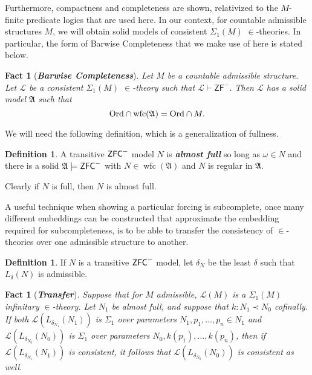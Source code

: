 \documentclass{amsart}
\newtheorem{fact}[theorem]{Fact}
\theoremstyle{definition}
\newtheorem{definition}[theorem]{Definition}
\theoremstyle{remark}
\newcommand{\ZFC}{\textup{\ensuremath{\textsf{ZFC}}}}
\newcommand{\Ord}{\textup{\ensuremath{\text{Ord}}}}
\DeclareMathOperator{\wfc}{wfc}
\begin{document}
Furthermore, compactness and completeness are shown, relativized to the $M$-finite predicate logics that are used here. In our context, for countable admissible structures $M$, we will obtain solid models of consistent $\Sigma_1(M)$ $\in$-theories. In particular, the form of Barwise Completeness that we make use of here is stated below.

\begin{fact}[\textbf{\emph{Barwise Completeness}}] \label{fact:completeness} Let $M$ be a countable admissible structure. Let $\mathcal L$ be a consistent $\Sigma_1(M)$ $\in$-theory such that $\mathcal L \vdash \textsf{ZF}^-$. Then $\mathcal L$ has a solid model $\mathfrak A$ such that $$\Ord \cap \wfc(\mathfrak A) = \Ord \cap M.$$ \end{fact}


We will need the following definition, which is a generalization of fullness.
\begin{definition} A transitive $\ZFC^-$ model $N$ is \emph{\textbf{almost full}} so long as $\omega \in N$ and there is a solid $\mathfrak A \models \ZFC^-$ with $N \in \wfc(\mathfrak A)$ and $N$ is regular in $\mathfrak A$. \end{definition}
Clearly if $N$ is full, then $N$ is almost full.

A useful technique when showing a particular forcing is subcomplete, once many different embeddings can be constructed that approximate the embedding required for subcompleteness, is to be able to transfer the consistency of $\in$-theories over one admissible structure to another.
\begin{definition} If $N$ is a transitive $\ZFC^-$ model, let $\delta_N$ be the least $\delta$ such that $L_\delta(N)$ is admissible. \end{definition}

\begin{fact}[\textbf{\emph{Transfer}}]\label{fact:Transfer} Suppose that for $M$ admissible, $\mathcal L(M)$ is a $\Sigma_1(M)$ infinitary $\in$-theory. Let $N_1$ be almost full, and suppose that $k: N_1 \prec N_0$ cofinally. If both $\mathcal L(L_{\delta_{N_1}}(N_1))$ is $\Sigma_1$ over parameters $N_1, p_1, \dots, p_n \in N_1$ and $\mathcal L(L_{\delta_{N_0}}(N_0))$ is $\Sigma_1$ over parameters $N_0, k(p_1), \dots, k(p_n)$, then  
if $\mathcal L(L_{\delta_{N_1}}(N_1))$ is consistent, it follows that $\mathcal L(L_{\delta_{N_0}}(N_0))$ is consistent as well. \end{fact} 
\end{document}
